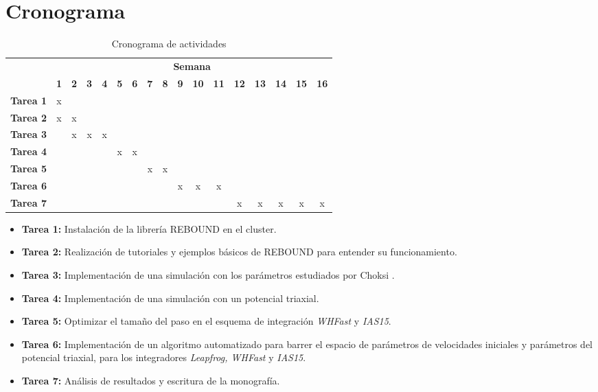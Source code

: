 \section{Cronograma}
	\begin{table}[h]
		\centering
		\caption{Cronograma de actividades}
		\label{tb: cronograma}
		\footnotesize
		\begin{tabular}{|c|c|c|c|c|c|c|c|c|c|c|c|c|c|c|c|c|}
			\hline
			\rowcolor[HTML]{C0C0C0} 
			\cellcolor[HTML]{C0C0C0}                                       & \multicolumn{16}{c|}{\cellcolor[HTML]{C0C0C0}\textbf{Semana}} \\ \cline{2-17} 
			\rowcolor[HTML]{EFEFEF} 
			\multirow{-2}{*}{\cellcolor[HTML]{C0C0C0}\textbf{Actividades}} & \textbf{1} & \textbf{2} & \textbf{3} & \textbf{4} & \textbf{5} & \textbf{6} & \textbf{7} & \textbf{8} & \textbf{9} & \textbf{10} & \textbf{11} & \textbf{12} & \textbf{13} & \textbf{14} & \textbf{15} & \textbf{16} \\ \hline
			\cellcolor[HTML]{EFEFEF}
			\textbf{Tarea 1} & x & & & & & & & & & & & & & & & \\ \hline
			\cellcolor[HTML]{EFEFEF}
			\textbf{Tarea 2} & x & x & & & & & & & & & & & & & & \\ \hline
			\cellcolor[HTML]{EFEFEF}
			\textbf{Tarea 3} & & x & x & x & & & & & & & & & & & & \\ \hline
			\cellcolor[HTML]{EFEFEF}
			\textbf{Tarea 4} & & & & & x & x & & & & & & & & & & \\ \hline
			\cellcolor[HTML]{EFEFEF}
			\textbf{Tarea 5} & & & & & & & x & x & & & & & & & & \\ \hline
			\cellcolor[HTML]{EFEFEF}
			\textbf{Tarea 6} & & & & & & & & & x & x & x & & & & & \\ \hline
			\cellcolor[HTML]{EFEFEF}
			\textbf{Tarea 7} & & & & & & & & & & & & x & x & x & x & x \\ \hline
		\end{tabular}
	\end{table}
	\begin{itemize}
		\item \textbf{Tarea 1:} Instalaci\'on de la librer\'ia REBOUND en el cluster.
		\item \textbf{Tarea 2:} Realización de tutoriales y ejemplos básicos de REBOUND para entender su funcionamiento.
		\item \textbf{Tarea 3:} Implementación de una simulación con los par\'ametros estudiados por Choksi \cite{choksi2017recoiling}.
		\item \textbf{Tarea 4:} Implementaci\'on de una simulaci\'on con un potencial triaxial.
		\item \textbf{Tarea 5:} Optimizar el tama\~no del paso en el esquema de integraci\'on \textit{WHFast} y \textit{IAS15}.
		\item \textbf{Tarea 6:} Implementaci\'on de un algoritmo automatizado para barrer el espacio de par\'ametros de velocidades iniciales y par\'ametros del potencial triaxial, para los integradores \textit{Leapfrog, WHFast} y \textit{IAS15}.
		\item \textbf{Tarea 7:} An\'alisis de resultados y escritura de la monograf\'ia.
		
	\end{itemize}